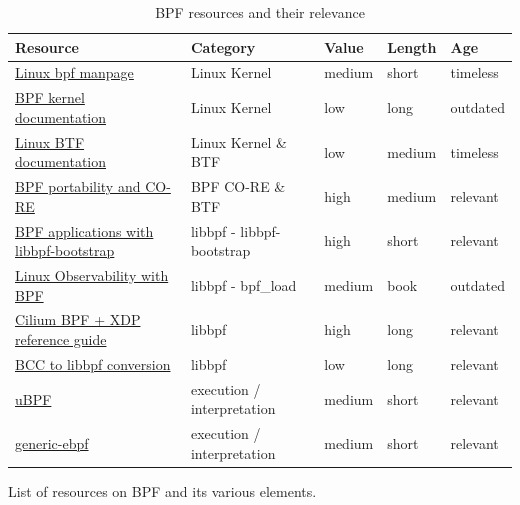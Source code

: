\documentclass[conference]{IEEEtran}
\begin{document}
\begin{table}[h!]
	\caption{BPF resources and their relevance}
	\label{table:bpfresources}
	\centering
	\begin{adjustbox}{width=0.5\textwidth}
		\begin{threeparttable}[]
			\begin{tabular}{lllll}
				\toprule
				\textbf{Resource} & \textbf{Category} & \textbf{Value} &
				\textbf{Length} & \textbf{Age} \\
				\midrule
				\href{https://www.man7.org/linux/man-pages/man2/bpf.2.html}{Linux bpf manpage} &
				Linux Kernel & medium & short & timeless \\
				\href{https://www.kernel.org/doc/Documentation/networking/filter.txt}{BPF kernel documentation} &
				Linux Kernel & low & long & outdated \\
				\href{https://www.kernel.org/doc/html/latest/bpf/btf.html}{Linux BTF documentation} &
				Linux Kernel \& BTF & low & medium & timeless \\
				\href{https://facebookmicrosites.github.io/bpf/blog/2020/02/19/bpf-portability-and-co-re.html}{BPF portability and CO-RE} &
				BPF CO-RE \& BTF & high & medium & relevant \\
				\href{https://nakryiko.com/posts/libbpf-bootstrap/}{BPF applications with libbpf-bootstrap} &
				libbpf - libbpf-bootstrap & high & short & relevant \\
				\href{https://www.oreilly.com/library/view/linux-observability-with/9781492050193/}{Linux Observability with BPF} &
				libbpf - bpf\_load & medium & book & outdated \\
				\href{https://facebookmicrosites.github.io/bpf/blog/2020/02/19/bpf-portability-and-co-re.html}{Cilium BPF + XDP reference guide} &
				libbpf & high & long & relevant \\
				\href{https://facebookmicrosites.github.io/bpf/blog/2020/02/20/bcc-to-libbpf-howto-guide.html}{BCC to libbpf conversion} &
				libbpf & low & long & relevant \\
				\href{https://github.com/iovisor/ubpf}{uBPF} &
				execution / interpretation & medium & short & relevant \\
				\href{https://github.com/generic-ebpf/generic-ebpf}{generic-ebpf} &
				execution / interpretation & medium & short & relevant \\
				\bottomrule
			\end{tabular}
			\begin{tablenotes}
				\centering List of resources on BPF and its various elements.
			\end{tablenotes}
		\end{threeparttable}
	\end{adjustbox}
\end{table}
\end{document}
